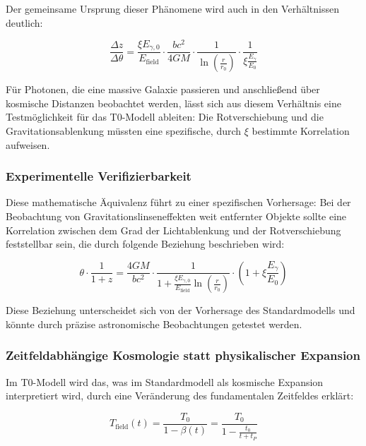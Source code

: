 \documentclass[12pt,a4paper]{article}
\theoremstyle{definition}
\begin{document}
\begin{verhaltnis}
	Der gemeinsame Ursprung dieser Phänomene wird auch in den Verhältnissen deutlich:
	
	\begin{equation}
		\frac{\Delta z}{\Delta \theta} = \frac{\xi E_{\gamma,0}}{E_{\text{field}}} \cdot \frac{bc^2}{4GM} \cdot \frac{1}{\ln\left(\frac{r}{r_0}\right)} \cdot \frac{1}{\xi \frac{E_\gamma}{E_0}}
	\end{equation}
	
	Für Photonen, die eine massive Galaxie passieren und anschließend über kosmische Distanzen beobachtet werden, lässt sich aus diesem Verhältnis eine Testmöglichkeit für das T0-Modell ableiten: Die Rotverschiebung und die Gravitationsablenkung müssten eine spezifische, durch $\xi$ bestimmte Korrelation aufweisen.
\end{verhaltnis}

\subsubsection{Experimentelle Verifizierbarkeit}

Diese mathematische Äquivalenz führt zu einer spezifischen Vorhersage: Bei der Beobachtung von Gravitationslinseneffekten weit entfernter Objekte sollte eine Korrelation zwischen dem Grad der Lichtablenkung und der Rotverschiebung feststellbar sein, die durch folgende Beziehung beschrieben wird:

\begin{equation}
	\theta \cdot \frac{1}{1+z} = \frac{4GM}{bc^2} \cdot \frac{1}{1 + \frac{\xi E_{\gamma,0}}{E_{\text{field}}} \ln\left(\frac{r}{r_0}\right)} \cdot \left(1 + \xi \frac{E_\gamma}{E_0}\right)
\end{equation}

Diese Beziehung unterscheidet sich von der Vorhersage des Standardmodells und könnte durch präzise astronomische Beobachtungen getestet werden.\subsubsection{Zeitfeldabhängige Kosmologie statt physikalischer Expansion}

Im T0-Modell wird das, was im Standardmodell als kosmische Expansion interpretiert wird, durch eine Veränderung des fundamentalen Zeitfeldes erklärt:

\begin{equation}
	T_{\text{field}}(t) = \frac{T_0}{1 - \beta(t)} = \frac{T_0}{1 - \frac{t_0}{t + t_P}}
\end{equation}
\end{document}
